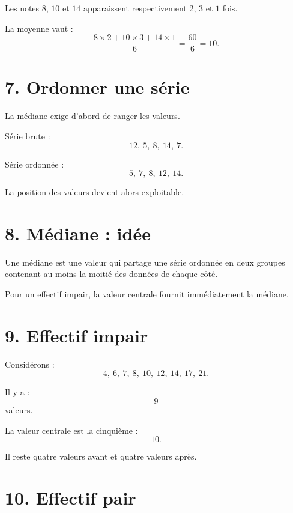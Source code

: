 \begin{exemple}
Les notes $8$, $10$ et $14$ apparaissent respectivement $2$, $3$ et $1$ fois.

La moyenne vaut :
\[
\dfrac{8\times2+10\times3+14\times1}{6}
=
\dfrac{60}{6}
=
10.
\]
\end{exemple}

\section{7. Ordonner une série}

La médiane exige d'abord de ranger les valeurs.

Série brute :
\[
12,\ 5,\ 8,\ 14,\ 7.
\]

Série ordonnée :
\[
5,\ 7,\ 8,\ 12,\ 14.
\]

La position des valeurs devient alors exploitable.

\section{8. Médiane : idée}

\begin{definition}
Une médiane est une valeur qui partage une série ordonnée en deux groupes contenant au moins la moitié des données de chaque côté.
\end{definition}

Pour un effectif impair, la valeur centrale fournit immédiatement la médiane.


\section{9. Effectif impair}

Considérons :
\[
4,\ 6,\ 7,\ 8,\ 10,\ 12,\ 14,\ 17,\ 21.
\]

Il y a :
\[
9
\]
valeurs.

La valeur centrale est la cinquième :
\[
\boxed{10}.
\]

Il reste quatre valeurs avant et quatre valeurs après.

\section{10. Effectif pair}

